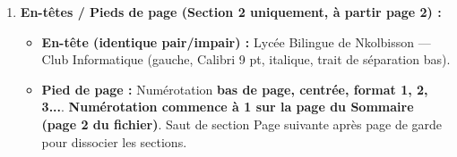 \documentclass[11pt]{article}
\begin{document}
\begin{exemplebox}
\begin{enumerate}
\begin{itemize}
\begin{itemize}
            \item \textbf{3.2 Projets innovants} (Style Titre 2) : Liste numérotée (1. Club Robotique, 2. Compétition Inter-lycées, 3. Site web du club).
        \end{itemize}
    \end{itemize}
    \item \textbf{En-têtes / Pieds de page (Section 2 uniquement, à partir page 2) :}
    \begin{itemize}
        \item \textbf{En-tête (identique pair/impair) :} \og Lycée Bilingue de Nkolbisson — Club Informatique \fg{} (gauche, Calibri 9 pt, italique, trait de séparation bas).
        \item \textbf{Pied de page :} Numérotation \textbf{bas de page, centrée, format 1, 2, 3...}. \textbf{Numérotation commence à 1 sur la page du Sommaire (page 2 du fichier)}. Saut de section \og Page suivante \fg{} après page de garde pour dissocier les sections.
    \end{itemize}
\end{enumerate}
\end{exemplebox}
\end{document}
